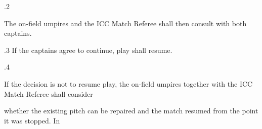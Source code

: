 \documentclass[12pt]{article}
\begin{document}
\vspace{\baselineskip}
{\fontsize{9pt}{10.8pt}.2 \tabto{0.49in} {\fontsize{8pt}{9.6pt}\selectfont The on-field umpires and the ICC Match Referee shall then consult with both captains.\par}\par}\par


\vspace{\baselineskip}
{\fontsize{9pt}{10.8pt}.3 \tabto{0.49in} If the captains agree to continue, play shall resume.\par}\par


\vspace{\baselineskip}
{\fontsize{9pt}{10.8pt}.4 \tabto{0.49in} {\fontsize{8pt}{9.6pt}\selectfont If the decision is not to resume play, the on-field umpires together with the ICC Match Referee shall consider\par}\par}\par


\vspace{\baselineskip}
\begin{adjustwidth}{0.0in}{0.03in}
\begin{Center}
{\fontsize{9pt}{10.8pt}\selectfont whether the existing pitch can be repaired and the match resumed from the point it was stopped. In\par}
\end{Center}\par

\end{adjustwidth}


\vspace{\baselineskip}

\vspace{\baselineskip}

\vspace{\baselineskip}

\vspace{\baselineskip}

\vspace{\baselineskip}
\begin{adjustwidth}{0.0in}{-0.01in}
\begin{Center}
{\fontsize{8pt}{9.6pt}\par}
\end{Center}\par

\end{adjustwidth}
\end{document}
